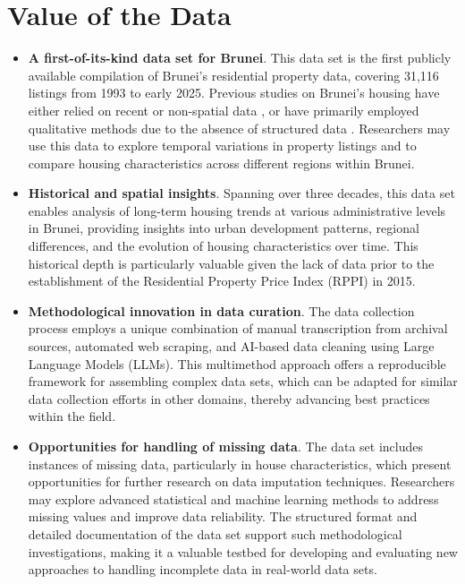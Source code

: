 \documentclass[
  number]{elsarticle}
\providecommand{\tightlist}{%
  \setlength{\itemsep}{0pt}\setlength{\parskip}{0pt}}\usepackage{longtable,booktabs,array}
\begin{document}
\section{Value of the Data}\label{value-of-the-data}

\begin{itemize}
\item
  \textbf{A first-of-its-kind data set for Brunei}. This data set is the
  first publicly available compilation of Brunei's residential property
  data, covering 31,116 listings from 1993 to early 2025. Previous
  studies on Brunei's housing have either relied on recent or
  non-spatial data \citep{ng2022characterising, jamil2025leveraging}, or
  have primarily employed qualitative methods due to the absence of
  structured data \citep{hassan2011cultural, hassan2023sociocultural}.
  Researchers may use this data to explore temporal variations in
  property listings and to compare housing characteristics across
  different regions within Brunei.
\item
  \textbf{Historical and spatial insights}. Spanning over three decades,
  this data set enables analysis of long-term housing trends at various
  administrative levels in Brunei, providing insights into urban
  development patterns, regional differences, and the evolution of
  housing characteristics over time. This historical depth is
  particularly valuable given the lack of data prior to the
  establishment of the Residential Property Price Index (RPPI)
  \citep{bdcb2021technical} in 2015.
\item
  \textbf{Methodological innovation in data curation}. The data
  collection process employs a unique combination of manual
  transcription from archival sources, automated web scraping, and
  AI-based data cleaning using Large Language Models (LLMs). This
  multimethod approach offers a reproducible framework for assembling
  complex data sets, which can be adapted for similar data collection
  efforts in other domains, thereby advancing best practices within the
  field.
\end{itemize}

\begin{itemize}
\tightlist
\item
  \textbf{Opportunities for handling of missing data}. The data set
  includes instances of missing data, particularly in house
  characteristics, which present opportunities for further research on
  data imputation techniques. Researchers may explore advanced
  statistical and machine learning methods to address missing values and
  improve data reliability. The structured format and detailed
  documentation of the data set support such methodological
  investigations, making it a valuable testbed for developing and
  evaluating new approaches to handling incomplete data in real-world
  data sets.
\end{itemize}
\end{document}
